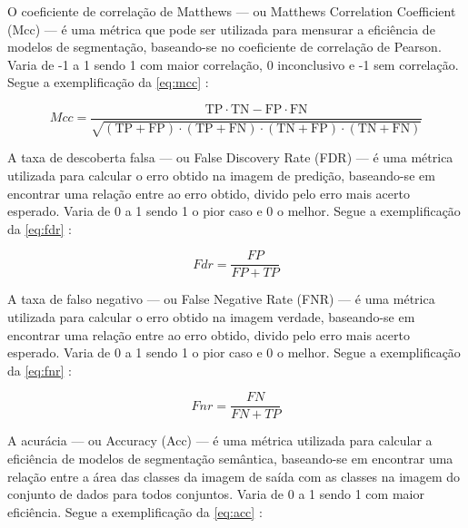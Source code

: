 
O coeficiente de correlação de Matthews — ou Matthews Correlation Coefficient (Mcc) —  é uma métrica que pode ser utilizada para mensurar a eficiência de modelos de segmentação,  baseando-se no coeficiente de correlação de Pearson. Varia de -1 a 1 sendo 1 com maior correlação, 0 inconclusivo e -1 sem correlação. Segue a exemplificação da \cref{eq:mcc} \space\cite{Chicco2020, confusion_matrix_calculator}:

\begin{equation}
	\label{eq:mcc}
	Mcc = \frac{\text{TP}\cdot\text{TN}-\text{FP}\cdot\text{FN}}{\sqrt{ (\text{TP}+\text{FP})\cdot(\text{TP}+\text{FN})\cdot(\text{TN}+\text{FP})\cdot(\text{TN}+\text{FN}) }}
\end{equation}


A taxa de descoberta falsa — ou False Discovery Rate (FDR) — é uma métrica utilizada para calcular o erro obtido na imagem de predição,  baseando-se em encontrar uma relação entre ao erro obtido, divido pelo erro mais acerto esperado. Varia de 0 a 1 sendo 1 o pior caso e 0 o melhor. Segue a exemplificação da \cref{eq:fdr} \space\cite{confusion_matrix_calculator}:

\begin{equation}
	\label{eq:fdr}
	Fdr = \frac{FP}{FP + TP}
\end{equation}



A taxa de falso negativo — ou False Negative Rate (FNR) — é uma métrica utilizada para calcular o erro obtido na imagem verdade,  baseando-se em encontrar uma relação entre ao erro obtido, divido pelo erro mais acerto esperado. Varia de 0 a 1 sendo 1 o pior caso e 0 o melhor. Segue a exemplificação da \cref{eq:fnr} \space\cite{confusion_matrix_calculator}:

\begin{equation}
	\label{eq:fnr}
	Fnr = \frac{FN}{FN + TP}
\end{equation}


A acurácia — ou Accuracy (Acc) — é uma métrica utilizada para calcular a eficiência de modelos de segmentação semântica,  baseando-se em encontrar uma relação entre a área das classes da imagem de saída com as classes na imagem do conjunto de dados para todos conjuntos. Varia de 0 a 1 sendo 1 com maior eficiência. Segue a exemplificação da \cref{eq:acc} \space\cite{Chicco2020}:

